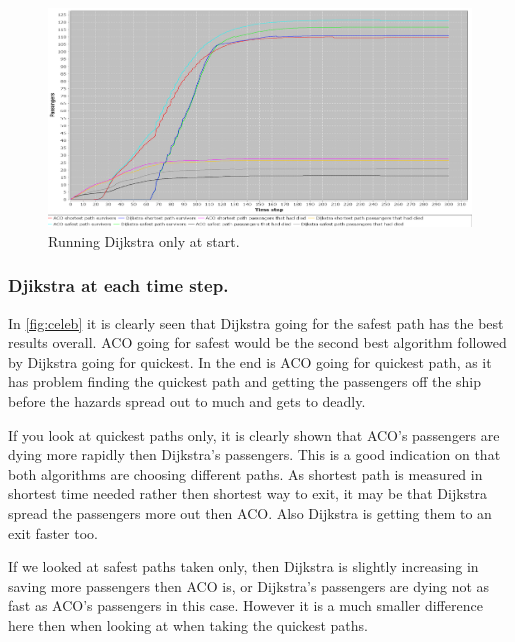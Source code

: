 \begin{figure} [h]
\centering
\hspace*{-1.0in}
\includegraphics[scale=0.35]{images/Graph-using-1000-rounds-140-passangers-and-one-fire-dijkstra-one-time.png}
\caption{Running Dijkstra only at start.}
\label{fig:celebDF}
\end{figure}

\subsubsection{Djikstra at each time step.}
In \ref{fig:celeb} it is clearly seen that Dijkstra going for the safest path has the best results overall. ACO going for safest would be the second best algorithm followed by Dijkstra going for quickest. In the end is ACO going for quickest path, as it has problem finding the quickest path and getting the passengers off the ship before the hazards spread out to much and gets to deadly.

If you look at quickest paths only, it is clearly shown that ACO's passengers are dying more rapidly then Dijkstra's passengers. This is a good indication on that both algorithms are choosing different paths. As shortest path is measured in shortest time needed rather then shortest way to exit, it may be that Dijkstra spread the passengers more out then ACO. Also Dijkstra is getting them to an exit faster too.

If we looked at safest paths taken only, then Dijkstra is slightly increasing in saving more passengers then ACO is, or Dijkstra's passengers are dying not as fast as ACO's passengers in this case. However it is a much smaller difference here then when looking at when taking the quickest paths.





